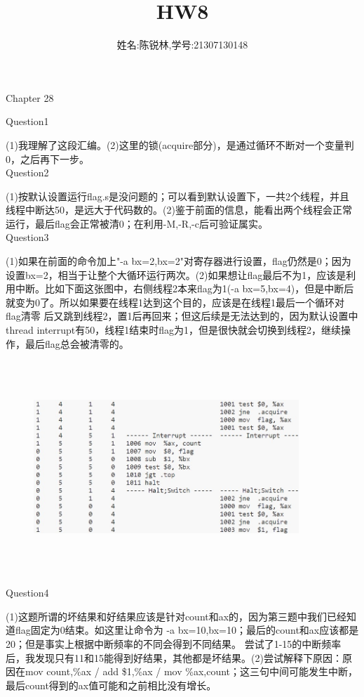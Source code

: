 \documentclass[11pt]{article}
\title{HW8}
\author{姓名:陈锐林,学号:21307130148}
\begin{document}
\maketitle
\begin{Large}
    \noindent Chapter 28\\
\end{Large}
Question1\par
(1)我理解了这段汇编。(2)这里的锁(acquire部分)，是通过循环不断对一个变量判0，之后再下一步。\\
Question2\par
(1)按默认设置运行flag.s是没问题的；可以看到默认设置下，一共2个线程，并且线程中断达50，是远大于代码数的。(2)鉴于前面的信息，能看出两个线程会正常运行，最后flag会正常被清0；在利用-M,-R,-c后可验证属实。\\
Question3\par
(1)如果在前面的命令加上"-a bx=2,bx=2"对寄存器进行设置，flag仍然是0；因为设置bx=2，相当于让整个大循环运行两次。(2)如果想让flag最后不为1，应该是利用中断。比如下面这张图中，右侧线程2本来flag为1(-a bx=5,bx=4)，但是中断后就变为0了。所以如果要在线程1达到这个目的，应该是在线程1最后一个循环对flag清零
后又跳到线程2，置1后再回来；但这后续是无法达到的，因为默认设置中thread interrupt有50，线程1结束时flag为1，但是很快就会切换到线程2，继续操作，最后flag总会被清零的。
\begin{figure}[H]
    \centering
    \includegraphics[height=8cm,width=10cm]{hw8-1.jpg}
\end{figure}
\newpage
\noindent Question4\par
(1)这题所谓的坏结果和好结果应该是针对count和ax的，因为第三题中我们已经知道flag固定为0结束。如这里让命令为 -a bx=10,bx=10；最后的count和ax应该都是20；但是事实上根据中断频率的不同会得到不同结果。
尝试了1-15的中断频率后，我发现只有11和15能得到好结果，其他都是坏结果。(2)尝试解释下原因：原因在mov count,\%ax / add \$1,\%ax / mov \%ax,count；这三句中间可能发生中断，最后count得到的ax值可能和之前相比没有增长。
\end{document}
